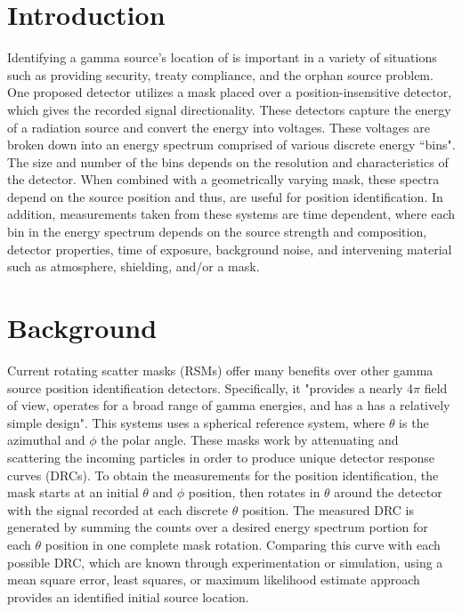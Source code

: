 \documentclass[3p,times]{elsarticle}
\begin{document}

\section{Introduction}
\label{intro}
Identifying a gamma source's location of is important in a variety of situations such as providing security, treaty compliance, and the orphan source problem.  
One proposed detector\cite{FitzGerald2015} utilizes a mask placed over a position-insensitive detector, which gives the recorded signal directionality.  These detectors capture the energy of a 
radiation source and convert the energy into voltages.  These voltages are broken down into an energy spectrum comprised of various discrete energy ``bins".  The size and number of the bins depends on the resolution and characteristics of the detector.	When combined with a geometrically varying mask, these spectra depend on the source position and thus, 
are useful for position identification.  In addition, measurements taken from these systems are time dependent, where each bin in the energy spectrum depends on the source strength and composition, detector properties, time of exposure, background noise, and intervening material such as atmosphere, shielding, and/or a mask. 

\section{Background}
Current rotating scatter masks (RSMs) offer many benefits over other gamma source position identification detectors.  
Specifically, it "provides a nearly 4$\pi$ field of view, operates for a broad range of gamma energies, and has a has a relatively simple design"\cite{Logan2017}. This systems uses 
a spherical reference system, where $\theta$ is the azimuthal and $\phi$ the polar angle.  These masks work by attenuating and scattering the incoming particles in order to produce unique detector response curves (DRCs)\cite{Logan2017}.  To obtain the measurements for the position identification, the mask starts at an initial $\theta$ and $\phi$ position, then rotates 
in $\theta$ around the detector with the signal recorded at each discrete $\theta$ position.  The measured DRC is generated by summing the counts over a desired energy spectrum portion for each $\theta$ position in one complete mask rotation.  Comparing this curve with each possible DRC, which are known through experimentation or simulation, using a mean square error, least squares, or maximum likelihood estimate approach provides an identified initial source location.
\end{document}
